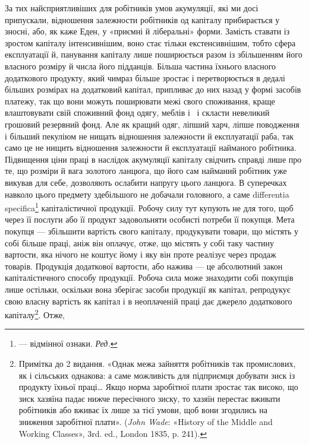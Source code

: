 За тих найсприятливіших для робітників умов акумуляції,
які ми досі припускали, відношення залежности робітників од
капіталу прибирається у зносні, або, як каже Еден, у «приємні
й ліберальні» форми. Замість ставати із зростом капіталу інтенсивнішим,
воно стає тільки екстенсивнішим, тобто сфера експлуатації
й, панування капіталу лише поширюється разом із збільшенням
його власного розміру й числа його підданців. Більша
частина їхнього власного додаткового продукту, який чимраз
більше зростає і перетворюється в дедалі більших розмірах на
додатковий капітал, припливає до них назад у формі засобів
платежу, так що вони можуть поширювати межі свого споживання,
краще влаштовувати свій споживний фонд одягу, меблів
і~ і скласти невеликий грошовий резервний фонд. Але як
кращий одяг, ліпший харч, ліпше поводження і більший пекуліюм
не нищать відношення залежности й експлуатації раба,
так само це не нищить відношення залежности й експлуатації
найманого робітника. Підвищення ціни праці в наслідок акумуляції
капіталу свідчить справді лише про те, що розміри й вага
золотого ланцюга, що його сам найманий робітник уже викував
для себе, дозволяють ослабити напругу цього ланцюга. В суперечках
навколо цього предмету здебільшого не добачали головного,
а саме differentia specifica\footnote*{
— відмінної ознаки. \emph{Ред.}
} капіталістичної продукції.
Робочу силу тут купують не для того, щоб через її послуги або
її продукт задовольняти особисті потреби її покупця. Мета покупця
— збільшити вартість свого капіталу, продукувати товари,
що містять у собі більше праці, аніж він оплачує, отже,
що містять у собі таку частину вартости, яка нічого не коштує
йому і яку він проте реалізує через продаж товарів. Продукція
додаткової вартости, або нажива — це абсолютний закон капіталістичного
способу продукції. Робоча сила може знаходити
собі покупців лише остільки, оскільки вона зберігає засоби продукції
як капітал, репродукує свою власну вартість як капітал
і в неоплаченій праці дає джерело додаткового капіталу\footnote{
Примітка до 2 видання. «Однак межа зайняття робітників так
промислових, як і сільських однакова: а саме можливість для підприємця
добувати зиск із продукту їхньої праці\dots{} Якщо норма заробітної
плати зростає так високо, що зиск хазяїна падає нижче пересічного
зиску, то хазяїн перестає вживати робітників або вживає їх лише за
тієї умови, щоб вони згодились на зниження заробітної плати». (\emph{John
Wade}: «History of the Middle and Working Classes», 3rd. ed., London
1835, p. 241).
}. Отже,
